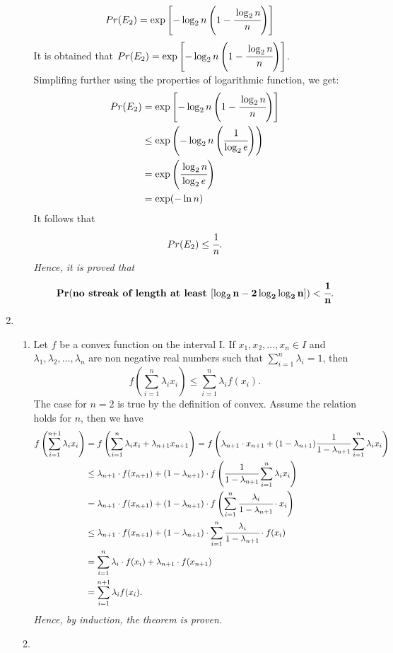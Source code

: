\documentclass{article}
\begin{document}
\begin{enumerate}
\begin{enumerate}
\begin{align*}
                Pr(E_2) &= \exp\left[-\log_2 n \left(1 - \cfrac{\log_2 n}{n}\right)\right]
            \end{align*}            
            It is obtained that \(Pr(E_2) = \exp\left[-\log_2 n \left(1 - \cfrac{\log_2 n}{n}\right)\right]\).\\
            Simplifing further using the properties of logarithmic function, we get:
            \begin{align*}
                Pr(E_2) &= \exp\left[-\log_2 n \left(1 - \cfrac{\log_2 n}{n}\right)\right]\\
                &\leq \exp\left(-\log_2 n \left(\cfrac{1}{\log_2 e}\right)\right)\\
                &= \exp\left(\cfrac{\log_2 n}{\log_2 e}\right)\\
                &= \exp(-\ln n)
            \end{align*}
            It follows that
            \[
                Pr(E_2) \leq \cfrac{1}{n}.
            \]
            \textit{Hence, it is proved that}
            \[
                \mathbf{Pr(\textbf{no streak of length at least }[\log_2 n - 2\log_2 \log_2 n]) < \cfrac{1}{n}}.
            \]
    \end{enumerate}

\newpage
\item 
    \begin{enumerate}
    \item 
        Let \(f\) be a convex function on the interval I. If \(x_1, x_2, \ldots, x_n \in I\) and \(\lambda_1, \lambda_2, \ldots, \lambda_n\) are non negative real numbers such that \(\sum_{i=1}^{n} \lambda_i = 1\), then
        \[
            f\left(\sum_{i=1}^{n} \lambda_i x_i\right) \leq \sum_{i=1}^{n} \lambda_i f(x_i).
        \]
        The case for \(n = 2\) is true by the definition of convex. Assume the relation holds for \(n\), then we have
        \begin{align*}
            f\left(\sum_{i=1}^{n+1} \lambda_i x_i\right) &= f\left(\sum_{i=1}^{n} \lambda_i x_i + \lambda_{n+1}x_{n+1}\right)
            = f\left(\lambda_{n+1}\cdot x_{n+1} + (1 - \lambda_{n+1}) \cfrac{1}{1 - \lambda_{n+1}}\sum_{i=1}^{n} \lambda_i x_i\right)\\
            &\leq \lambda_{n+1}\cdot f(x_{n+1}) + (1 - \lambda_{n+1})\cdot f\left(\cfrac{1}{1 - \lambda_{n+1}}\sum_{i=1}^{n} \lambda_i x_i\right)\\
            &= \lambda_{n+1}\cdot f(x_{n+1}) + (1 - \lambda_{n+1})\cdot f\left(\sum_{i=1}^{n} \cfrac{\lambda_i}{1 - \lambda_{n+1}}\cdot x_i\right)\\
            &\leq \lambda_{n+1}\cdot f(x_{n+1}) + (1 - \lambda_{n+1})\cdot \sum_{i=1}^{n} \cfrac{\lambda_i}{1 - \lambda_{n+1}}\cdot f(x_i)\\
            &= \sum_{i=1}^{n} \lambda_i\cdot f(x_i) + \lambda_{n+1}\cdot f(x_{n+1})\\
            &= \sum_{i=1}^{n+1} \lambda_i f(x_i).
        \end{align*} 
        \textit{Hence, by induction, the theorem is proven.}\\
    \item 
        

\end{enumerate}
\end{enumerate}
\end{document}
